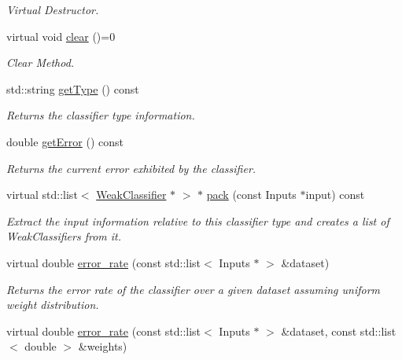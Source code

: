 \begin{DoxyCompactItemize}
\begin{DoxyCompactList}\small\item\em Virtual Destructor. \end{DoxyCompactList}\item 
virtual void \hyperlink{classiCub_1_1boostMIL_1_1WeakClassifier_ae5e3b28921109788e872ab6c035502f1}{clear} ()=0
\begin{DoxyCompactList}\small\item\em Clear Method. \end{DoxyCompactList}\item 
std\+::string \hyperlink{classiCub_1_1boostMIL_1_1WeakClassifier_aa5de990b0baac11f35f74493ca853ac5}{get\+Type} () const 
\begin{DoxyCompactList}\small\item\em Returns the classifier type information. \end{DoxyCompactList}\item 
double \hyperlink{classiCub_1_1boostMIL_1_1WeakClassifier_a525811a7380bcfd3cbc1edbe90e0842a}{get\+Error} () const 
\begin{DoxyCompactList}\small\item\em Returns the current error exhibited by the classifier. \end{DoxyCompactList}\item 
virtual std\+::list$<$ \hyperlink{classiCub_1_1boostMIL_1_1WeakClassifier}{Weak\+Classifier} $\ast$ $>$ $\ast$ \hyperlink{classiCub_1_1boostMIL_1_1WeakClassifier_abdf0b9bd48be536cd44939dc733097ed}{pack} (const Inputs $\ast$input) const 
\begin{DoxyCompactList}\small\item\em Extract the input information relative to this classifier type and creates a list of Weak\+Classifiers from it. \end{DoxyCompactList}\item 
virtual double \hyperlink{classiCub_1_1boostMIL_1_1WeakClassifier_a8f9de230214c99305df65010e5ddbe77}{error\+\_\+rate} (const std\+::list$<$ Inputs $\ast$ $>$ \&dataset)
\begin{DoxyCompactList}\small\item\em Returns the error rate of the classifier over a given dataset assuming uniform weight distribution. \end{DoxyCompactList}\item 
virtual double \hyperlink{classiCub_1_1boostMIL_1_1WeakClassifier_a294f03d21af03a5f96875562a5a979a0}{error\+\_\+rate} (const std\+::list$<$ Inputs $\ast$ $>$ \&dataset, const std\+::list$<$ double $>$ \&weights)

\end{DoxyCompactItemize}
